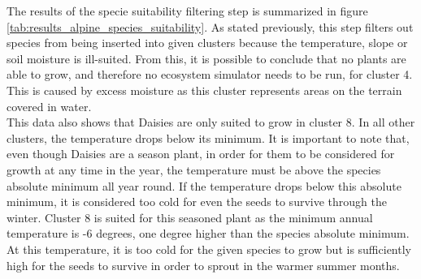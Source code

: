 The results of the specie suitability filtering step is summarized in figure \ref{tab:results_alpine_species_suitability}. As stated previously, this step filters out species from being inserted into given clusters because the temperature, slope or soil moisture is ill-suited. From this, it is possible to conclude that no plants are able to grow, and therefore no ecosystem simulator needs to be run, for cluster 4. This is caused by excess moisture as this cluster represents areas on the terrain covered in water.\\ 
This data also shows that Daisies are only suited to grow in cluster 8. In all other clusters, the temperature drops below its minimum. It is important to note that, even though Daisies are a season plant, in order for them to be considered for growth at any time in the year, the temperature must be above the species absolute minimum all year round. If the temperature drops below this absolute minimum, it is considered too cold for even the seeds to survive through the winter. Cluster 8 is suited for this seasoned plant as the minimum annual temperature is -6 degrees, one degree higher than the species absolute minimum. At this temperature, it is too cold for the given species to grow but is sufficiently high for the seeds to survive in order to sprout in the warmer summer months.\\


